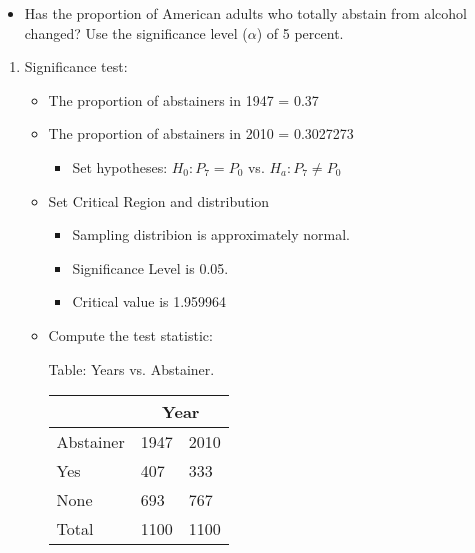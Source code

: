 \documentclass[11pt]{book}\usepackage[]{graphicx}\usepackage[]{color}
\begin{document}
\begin{exercises}
\begin{exercise}
\begin{itemize}
\item Has the proportion of American adults who totally abstain from alcohol \\ changed?  Use the significance level ($\alpha$) of 5 percent.
\end{itemize}

  \vspace{5mm}

\end{exercise}
\vspace{2mm}
\begin{solution}

  	  \begin{enumerate}
	 \item Significance test:


\begin{itemize}
\item The proportion of abstainers in 1947 = 0.37
\item The proportion of abstainers in 2010 = 0.3027273
  \begin{itemize}
  \item Set hypotheses: $H_0: P_7 = P_0$ vs. $H_a: P_7 \ne P_0$
  \end{itemize}

\item Set Critical Region and distribution

  \begin{itemize}
  \item Sampling distribion is approximately normal.
  \item Significance Level is 0.05.
  \item Critical value is 1.959964
  \end{itemize}

\item Compute the test statistic:

\begin{minipage}[h]{6cm}

Table: Years vs. Abstainer.



      \begin{tabular}{@{} p{2.5cm} p{1cm} p{1cm} @{}} \hline %
     &  \multicolumn{2}{c}{Year } \\ \hline
     Abstainer   & 1947 & 2010 \\ \hline
     Yes   & 407 & 333 \\
     None          & 693 & 767 \\ \hline
     Total        & 1100 & 1100 \\ \hline
   \end{tabular}


\end{minipage}
\end{itemize}
\end{enumerate}
\end{solution}
\end{exercises}
\end{document}
